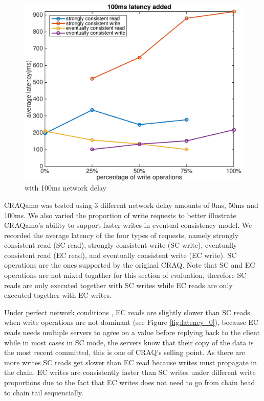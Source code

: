 \begin{figure}[hbt]
\centering
\includegraphics[width=0.95\linewidth]{figures/latency_100.pdf}
\caption{with 100ms network delay}
\label{fig:latency_100}
\end{figure}
\vspace{-2mm}


CRAQamo was tested using 3 different network delay amounts of 0ms, 50ms and 100ms. We also varied the proportion of write requests to better illustrate CRAQamo's ability to support faster writes in eventual consistency model. We recorded the average latency of the four types of requests, namely strongly consistent read (SC read), strongly consistent write (SC write), eventually consistent read (EC read), and eventually consistent write (EC write). SC operations are the ones supported by the original CRAQ. Note that SC and EC operations are not mixed togather for this section of evaluation, therefore SC reads are only executed together with SC writes while EC reads are only executed together with EC writes. 

Under perfect network conditions , EC reads are slightly slower than SC reads when write operations are not dominant (see Figure \ref{fig:latency_0}), because EC reads needs multiple servers to agree on a value before replying back to the client while in most cases in SC mode, the servers know that their copy of the data is the most recent committed, this is one of CRAQ's selling point. As there are more writes SC reads get slower than EC read because writes must propagate in the chain. EC writes are consistently faster than SC writes under different write proportions due to the fact that EC writes does not need to go from chain head to chain tail sequencially.

